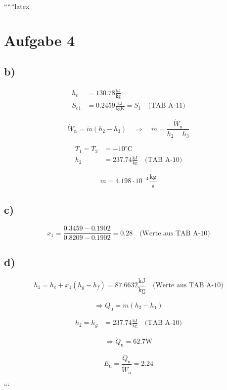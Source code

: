 
``````latex


\section*{Aufgabe 4}

\subsection*{b)}
\begin{align*}
    h_{e} &= \underline{130.78} \frac{\text{kJ}}{\text{kg}} \\
    S_{e1} &= 0.2459 \frac{\text{kJ}}{\text{kgK}} = S_{1} \quad \text{(TAB A-11)}
\end{align*}

\[
    \dot{W}_{\text{n}} = \dot{m} (h_{2} - h_{3}) \quad \Rightarrow \quad \dot{m} = \frac{\dot{W}_{\text{n}}}{h_{2} - h_{3}}
\]

\begin{align*}
    T_{1} = T_{2} &= -10^\circ \text{C} \\
    h_{2} &= 237.74 \frac{\text{kJ}}{\text{kg}} \quad \text{(TAB A-10)}
\end{align*}

\[
    \dot{m} = 4.198 \cdot 10^{-4} \frac{\text{kg}}{\text{s}}
\]

\subsection*{c)}
\[
    x_{1} = \frac{0.3459 - 0.1902}{0.8209 - 0.1902} = 0.28 \quad \text{(Werte aus TAB A-10)}
\]

\subsection*{d)}
\[
    h_{1} = h_{e} + x_{1} (h_{g} - h_{f}) = 87.6632 \frac{\text{kJ}}{\text{kg}} \quad \text{(Werte aus TAB A-10)}
\]

\[
    \Rightarrow \dot{Q}_{\text{u}} = \dot{m} (h_{2} - h_{1})
\]

\begin{align*}
    h_{2} = h_{g} &= 237.74 \frac{\text{kJ}}{\text{kg}} \quad \text{(TAB A-10)}
\end{align*}

\[
    \Rightarrow \dot{Q}_{\text{u}} = 62.7 \text{W}
\]

\[
    E_{\text{u}} = \frac{\dot{Q}_{\text{u}}}{\dot{W}_{\text{n}}} = 2.24
\]

```